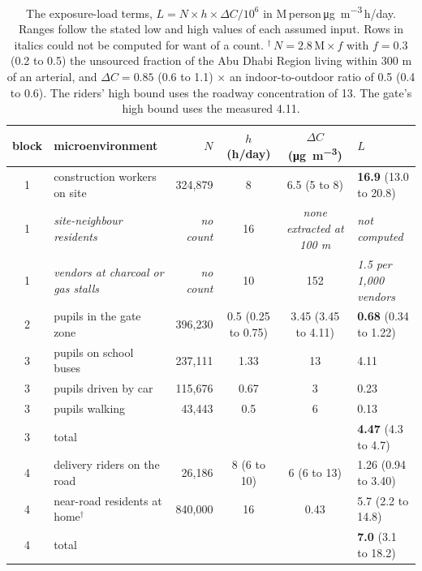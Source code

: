 \documentclass[10pt,a4paper]{article}
\newcommand{\ugm}{\si{\micro\gram\per\cubic\metre}}
\newcommand{\load}{M\,person\,\ugm\,h/day}
\begin{document}
\begin{table}[t]\centering\footnotesize
\caption{The exposure-load terms, \(L=N\times h\times\Delta C/10^6\) in \load. Ranges follow the stated low and high values of each assumed input. Rows in italics could not be computed for want of a count. \(^{\dagger}\)\,\(N=2.8\,\mathrm{M}\times f\) with \(f=0.3\) (0.2 to 0.5) the unsourced fraction of the Abu Dhabi Region living within 300 m of an arterial, and \(\Delta C=0.85\) (0.6 to 1.1) \(\times\) an indoor-to-outdoor ratio of 0.5 (0.4 to 0.6). The riders' high bound uses the roadway concentration of 13. The gate's high bound uses the measured 4.11.}\label{tab:load}
\begin{tabular}{@{}clrccl@{}}\toprule
block & microenvironment & \(N\) & \(h\) (h/day) & \(\Delta C\) (\ugm) & \(L\)\\ \midrule
1 & construction workers on site & 324,879 & 8 & 6.5 (5 to 8) & \textbf{16.9} (13.0 to 20.8)\\
1 & \emph{site-neighbour residents} & \emph{no count} & 16 & \emph{none extracted at 100 m} & \emph{not computed}\\
1 & \emph{vendors at charcoal or gas stalls} & \emph{no count} & 10 & 152 & \emph{1.5 per 1,000 vendors}\\
2 & pupils in the gate zone & 396,230 & 0.5 (0.25 to 0.75) & 3.45 (3.45 to 4.11) & \textbf{0.68} (0.34 to 1.22)\\
3 & pupils on school buses & 237,111 & 1.33 & 13 & 4.11\\
3 & pupils driven by car & 115,676 & 0.67 & 3 & 0.23\\
3 & pupils walking & 43,443 & 0.5 & 6 & 0.13\\
3 & total & & & & \textbf{4.47} (4.3 to 4.7)\\
4 & delivery riders on the road & 26,186 & 8 (6 to 10) & 6 (6 to 13) & 1.26 (0.94 to 3.40)\\
4 & near-road residents at home\(^{\dagger}\) & 840,000 & 16 & 0.43 & 5.7 (2.2 to 14.8)\\
4 & total & & & & \textbf{7.0} (3.1 to 18.2)\\
\bottomrule\end{tabular}\end{table}
\end{document}
